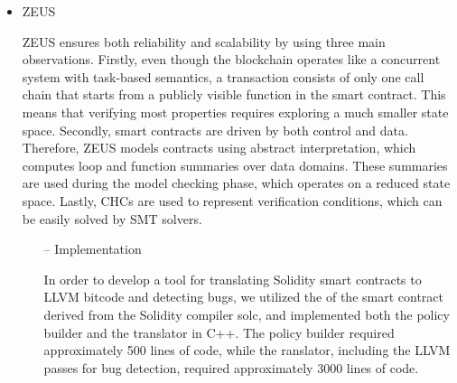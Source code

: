 \begin{itemize}

\hfill
\item	ZEUS

ZEUS ensures both reliability and scalability by using three main observations. Firstly, even though the blockchain operates like a concurrent system with task-based semantics, a transaction consists of only one call chain that starts from a publicly visible function in the smart contract. This means that verifying most properties requires exploring a much smaller state space. Secondly, smart contracts are driven by both control and data. Therefore, ZEUS models contracts using abstract interpretation, which computes loop and function summaries over data domains. These summaries are used during the model checking phase, which operates on a reduced state space. Lastly, \ac{CHC}s are used to represent verification conditions, which can be easily solved by \ac{SMT} solvers.


\hfill
\begin{itemize}

    \item[--] Implementation
    

In order to develop a tool for translating Solidity smart contracts to \ac{LLVM} bitcode and detecting bugs, we utilized the  of the smart contract derived from the Solidity compiler solc, and implemented both the policy builder and the translator in C++. The policy builder required approximately 500 lines of code, while the ranslator, including the \ac{LLVM} passes for bug detection, required approximately 3000 lines of code.


\end{itemize}
\end{itemize}
